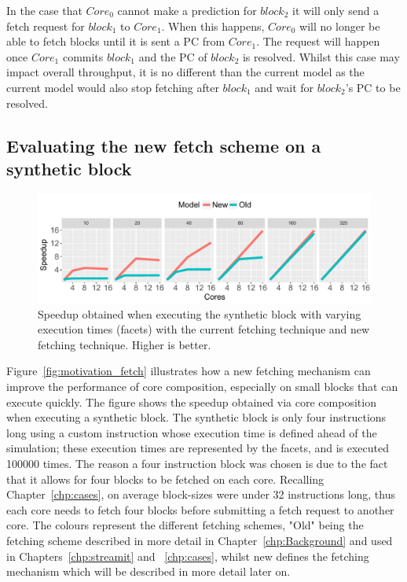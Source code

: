 In the case that $Core_0$ cannot make a prediction for $block_2$ it will only send a fetch request for $block_1$ to $Core_1$.
When this happens, $Core_0$ will no longer be able to fetch blocks until it is sent a PC from $Core_1$.
The request will happen once $Core_1$ commits $block_1$ and the PC of $block_2$ is resolved.
Whilst this case may impact overall throughput, it is no different than the current model as the current model would also stop fetching after $block_1$ and wait for $block_2$'s PC to be resolved.


\subsection{Evaluating the new fetch scheme on a synthetic block}
\begin{figure}[t]
    \centering
    \includegraphics[width=1\textwidth]{chapter3/graphics/motivation_fetch.pdf}
    \caption{Speedup obtained when executing the synthetic block with varying execution times (facets) with the current fetching technique and new fetching technique. Higher is better.}
    \label{fig:new_fetch_ex}
\vspace{1em}
	\end{figure}

Figure~\ref{fig:motivation_fetch} illustrates how a new fetching mechanism can improve the performance of core composition, especially on small blocks that can execute quickly.
The figure shows the speedup obtained via core composition when executing a synthetic block.
The synthetic block is only four instructions long using a custom instruction whose execution time is defined ahead of the simulation; these execution times are represented by the facets, and is executed 100000 times.
The reason a four instruction block was chosen is due to the fact that it allows for four blocks to be fetched on each core.
Recalling Chapter~\ref{chp:cases}, on average block-sizes were under 32 instructions long, thus each core needs to fetch four blocks before submitting a fetch request to another core.
The colours represent the different fetching schemes, "Old" being the fetching scheme described in more detail in Chapter~\ref{chp:Background} and used in Chapters~\ref{chp:streamit} and ~\ref{chp:cases}, whilst new defines the fetching mechanism which will be described in more detail later on.

